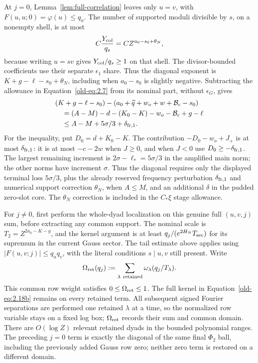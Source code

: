 \documentclass[11pt,a4paper]{article}
\numberwithin{equation}{section}
\numberwithin{figure}{section}
\theoremstyle{definition}
\theoremstyle{remark}
\begin{document}
At \(j=0\), Lemma~\ref{lem:full-correlation} leaves only \(u=v\),
with \(F(u,u;0)=\varphi(u)\le q_u\).  The number of supported
moduli divisible by \(s\), on a nonempty shell, is at most
\[
 C\frac{Y_{\rm col}}{q_s}=C Z^{a_0-s_0+\theta_N},
\]
because writing \(u=sv\) gives \(Y_{\rm col}/q_s\ge1\) on that shell.
The divisor-bounded coefficients use their separate \(\epsilon_1\)
share.  Thus the diagonal exponent is
\(K+g-\ell-s_0+\theta_N\), including when \(a_0-s_0\) is slightly
negative.  Subtracting the allowance in Equation~\eqref{old-eq:2.7}
from its nominal part, without \(\epsilon_G\), gives
\begin{equation}
 \begin{split}
 &(K+g-\ell-s_0)
 -(a_0+\widetilde q+w_o+w+\mathcal B_c-s_0)\\
 &\quad=(A-M)-d-(K_0-K)-w_o-\mathcal B_c+g-\ell\\
 &\quad\le A-M+5\sigma/3+\delta_{{\rm fr},1}.
 \end{split}
 \label{old-eq:2.12}
\end{equation}
For the inequality, put \(D_0=d+K_0-K\).  The contribution
\(-D_0-w_o+J_+\) is at most \(\delta_{{\rm fr},1}\): it is at most
\(-c-2w\) when \(J\ge0\), and when \(J<0\) use
\(D_0\ge-\delta_{{\rm fr},1}\).
The largest remaining increment is
\(2\sigma-\ell_*=5\sigma/3\) in the amplified main norm;
the other norms have increment \(\sigma\).  Thus the diagonal
requires only the displayed terminal loss \(5\sigma/3\), plus
the already reserved frequency perturbation \(\delta_{{\rm fr},1}\)
and numerical support correction \(\theta_N\), when \(A\le M\),
and an additional \(\delta\) in the padded zero-slot core.  The
\(\theta_N\) correction is included in the \(C_*\xi\) stage allowance.

For \(j\ne0\), first perform the whole-dyad localization on this
genuine full \((u,v,j)\) sum, before extracting any common support.
The nominal scale is
\(T_2=Z^{2a_0-K-g}\), and the kernel argument is at least
\(q_j/(e^{2H_N}T_{\rm sec})\) for its supremum in the current
Gauss sector.  The tail estimate above applies using
\(|F(u,v;j)|\le q_uq_v\), with the literal conditions
\(s\mid u,v\) still present.  Write
\[
 \Omega_{\rm ret}(q_j)
 :=\sum_{\lambda\ {\rm retained}}\omega_\lambda(q_j/T_\lambda).
\]
This common row weight satisfies \(0\le\Omega_{\rm ret}\le1\).
The full kernel in Equation~\eqref{old-eq:2.18b} remains on every
retained term.  All subsequent signed Fourier separations are performed
one retained \(\lambda\) at a time, so the normalized row variable
stays on a fixed log box; \(\Omega_{\rm ret}\) records their sum and
common domain.  There are \(O(\log Z)\) relevant retained dyads in
the bounded polynomial ranges.  The preceding \(j=0\) term is exactly the diagonal
of the same final \(\Phi_2\) ball, including the previously added
Gauss row zero; neither zero term is restored on a different domain.
\end{document}
